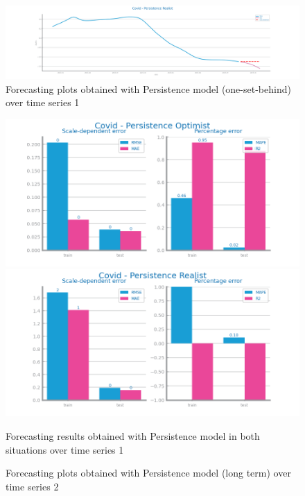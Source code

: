 \documentclass[10pt]{extarticle}
\begin{document}
\begin{figure}[H]
\centering\includegraphics[scale=0.4]{images/dataset1/time_series/Covid - Persistence Realist_forecasting_series.png}
\caption{Forecasting plots obtained with Persistence model (one-set-behind) over time series 1}
\end{figure}

\begin{figure}[H]
\centering\includegraphics[scale=0.5]{images/dataset1/time_series/Covid - Persistence Optimist_forecasting_eval.png}
\centering\includegraphics[scale=0.5]{images/dataset1/time_series/Covid - Persistence Realist_forecasting_eval.png}
\caption{Forecasting results obtained with Persistence model in both situations over time series 1}
\end{figure}

\begin{figure}[H]
\caption{Forecasting plots obtained with Persistence model (long term) over time series 2}
\end{figure}
\end{document}
